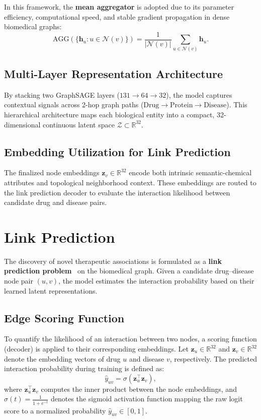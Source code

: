 \documentclass[preprint,12pt]{elsarticle}
\begin{document}
In this framework, the \textbf{mean aggregator} is adopted due to its parameter efficiency, computational speed, and stable gradient propagation in dense biomedical graphs:
\begin{equation}
    \mathrm{AGG}\left( \{ \mathbf{h}_u : u \in \mathcal{N}(v) \} \right) = \frac{1}{|\mathcal{N}(v)|} \sum_{u \in \mathcal{N}(v)} \mathbf{h}_u.
\end{equation}

\subsection{Multi-Layer Representation Architecture}
By stacking two GraphSAGE layers ($131 \to 64 \to 32$), the model captures contextual signals across 2-hop graph paths ($\text{Drug} \to \text{Protein} \to \text{Disease}$). This hierarchical architecture maps each biological entity into a compact, 32-dimensional continuous latent space $\mathcal{Z} \subset \mathbb{R}^{32}$.

\subsection{Embedding Utilization for Link Prediction}
The finalized node embeddings $\mathbf{z}_v \in \mathbb{R}^{32}$ encode both intrinsic semantic-chemical attributes and topological neighborhood context. These embeddings are routed to the link prediction decoder to evaluate the interaction likelihood between candidate drug and disease pairs.

\section{Link Prediction}
The discovery of novel therapeutic associations is formulated as a \textbf{link prediction problem}~\cite{ref11} on the biomedical graph. Given a candidate drug--disease node pair $(u, v)$, the model estimates the interaction probability based on their learned latent representations.

\subsection{Edge Scoring Function}
To quantify the likelihood of an interaction between two nodes, a scoring function (decoder) is applied to their corresponding embeddings. Let $\mathbf{z}_u \in \mathbb{R}^{32}$ and $\mathbf{z}_v \in \mathbb{R}^{32}$ denote the embedding vectors of drug $u$ and disease $v$, respectively. The predicted interaction probability during training is defined as:
\begin{equation}
    \hat{y}_{uv} = \sigma \left( \mathbf{z}_u^\top \mathbf{z}_v \right),
\end{equation}
where $\mathbf{z}_u^\top \mathbf{z}_v$ computes the inner product between the node embeddings, and $\sigma(t) = \frac{1}{1 + e^{-t}}$ denotes the sigmoid activation function mapping the raw logit score to a normalized probability $\hat{y}_{uv} \in [0, 1]$.
\end{document}
